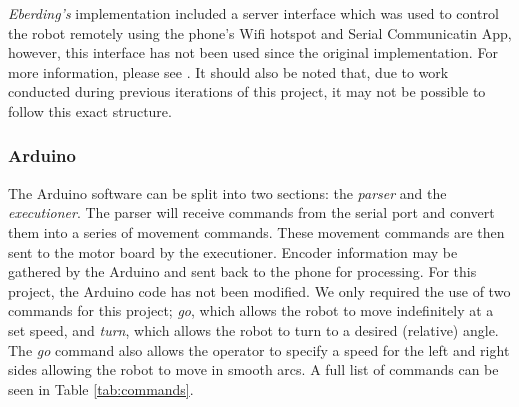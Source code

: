 \documentclass[a4paper,12pt]{article}
\begin{document}
\textit{Eberding's} implementation included a server interface which was used to control the robot
remotely
using the phone's Wifi hotspot and Serial Communicatin App, however, this interface has not been used
since the original implementation. For more information, please see \cite{Eberding2016}. It should
also be noted that, due to work conducted during previous iterations of this project, it may not
be possible to follow this exact structure.


\subsubsection{Arduino}
The Arduino software can be split into two sections: the \textit{parser} and the \textit{executioner}.
The parser will receive commands from the serial port and convert them into a series of movement
commands. These movement commands are then sent to the motor board by the executioner. Encoder
information may be gathered by the Arduino and sent back to the phone for processing.
For this project,
the Arduino code has not been modified. We only required the use of two commands for this project;
\textit{go}, which allows the robot to move indefinitely at a set speed, and \textit{turn}, which
allows the robot to turn to a desired (relative) angle. The \textit{go} command also allows the
operator to specify a speed for the left and right sides allowing the robot to move in smooth arcs.
A full list of commands can be seen in Table \ref{tab:commands}.
\end{document}
